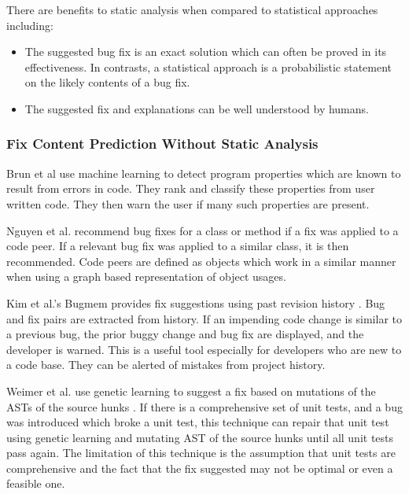\documentclass[10pt, conference, letterpaper, compsocconf]{IEEEtran}
\begin{document}
There are benefits to static analysis when compared to statistical
approaches including:

\begin{itemize}

\item The suggested bug fix is an exact solution which can often be proved
in its effectiveness. In contrasts, a statistical approach is a probabilistic
statement on the likely contents of a bug fix.

\item The suggested fix and explanations can be well understood by humans.

\end{itemize}

\subsubsection{Fix Content Prediction Without Static Analysis}
Brun et al \cite{Brun2004p1} use machine learning to detect program properties
which are known to result from errors in code. They rank and classify these properties from user written code. They then warn the user if many
such properties are present.

Nguyen et al. \cite{nguyen2010recurring} recommend bug fixes for a class or method if a fix was applied to a code peer. If a relevant bug fix was applied to a similar class, it is then recommended. Code peers are defined as objects which work in a similar manner when using a graph based representation of object usages.

Kim et al.'s Bugmem provides fix suggestions using past revision history \cite{Kim2006} . Bug and fix pairs are extracted from history. If an impending code change is similar to a previous bug, the prior buggy change and bug fix are displayed, and the developer is warned. This is a useful tool especially for developers who are new to a code base. They can be alerted of mistakes from project history. 

Weimer et al. use genetic learning to suggest a fix based on mutations of the ASTs of the source hunks \cite{Weimer:2009:AFP:1555001.1555051}. If there is a
comprehensive set of unit tests, and a bug was introduced which broke a unit test, this technique can repair that unit test using genetic
learning and mutating AST of the source hunks until all unit tests pass again. The limitation of this technique is the assumption that unit
tests are comprehensive and the fact that the fix suggested may not be optimal or even a feasible one.
\end{document}
